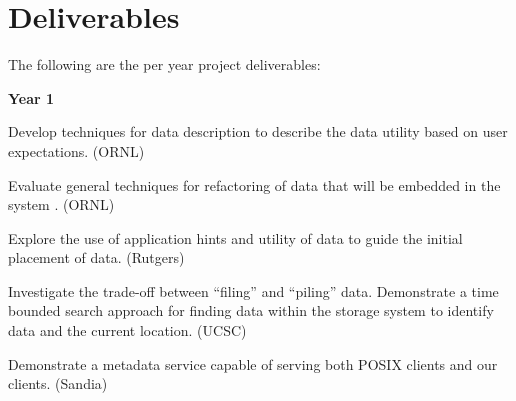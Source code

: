 \section{Deliverables}
The following are the per year project deliverables:
\small

\textbf{Year 1}
\begin{tightItemize}
\item Develop  techniques for data description  to 
describe the data utility based on user expectations. (ORNL)

\item Evaluate general  techniques for refactoring of data
that will be embedded in the system . (ORNL)
\item Explore the use of application hints and utility of data to guide the initial placement of data. 
(Rutgers)
\item Investigate the trade-off between ``filing'' and ``piling'' data. 
Demonstrate a time bounded search approach for finding data within the storage system
to identify data and the current location. (UCSC)
\item Demonstrate a metadata service capable of serving both POSIX clients and our clients. (Sandia)
\end{tightItemize}

